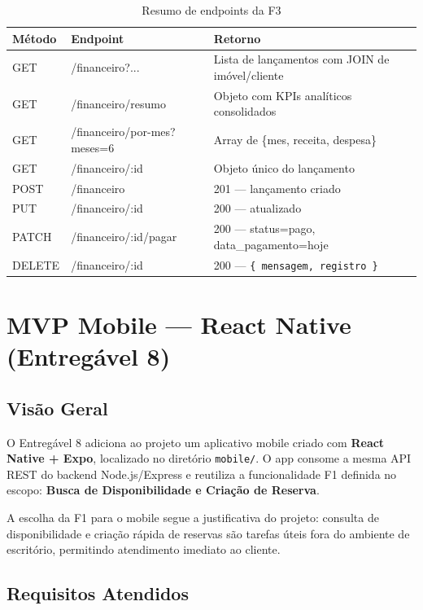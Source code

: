 \documentclass[12pt, a4paper]{article}
\newcommand{\thead}[1]{\cellcolor{tableheader}\color{white}\bfseries #1}
\newcommand{\talt}{\rowcolor{tablerowalt}}
\begin{document}
\begin{table}[H]
\centering
\begin{tabularx}{\textwidth}{|l|l|X|}
\hline
\thead{Método} & \thead{Endpoint} & \thead{Retorno} \\
\hline
GET    & /financeiro?...            & Lista de lançamentos com JOIN de imóvel/cliente \\
\talt GET    & /financeiro/resumo         & Objeto com KPIs analíticos consolidados \\
GET    & /financeiro/por-mes?meses=6 & Array de \{mes, receita, despesa\} \\
\talt GET    & /financeiro/:id            & Objeto único do lançamento \\
POST   & /financeiro                & 201 — lançamento criado \\
\talt PUT    & /financeiro/:id            & 200 — atualizado \\
PATCH  & /financeiro/:id/pagar      & 200 — status=pago, data\_pagamento=hoje \\
\talt DELETE & /financeiro/:id            & 200 — \texttt{\{ mensagem, registro \}} \\
\hline
\end{tabularx}
\caption{Resumo de endpoints da F3}
\end{table}

\section{MVP Mobile — React Native (Entregável 8)}

\subsection{Visão Geral}

O Entregável 8 adiciona ao projeto um aplicativo mobile criado com \textbf{React Native + Expo}, localizado no diretório \texttt{mobile/}. O app consome a mesma API REST do backend Node.js/Express e reutiliza a funcionalidade F1 definida no escopo: \textbf{Busca de Disponibilidade e Criação de Reserva}.

A escolha da F1 para o mobile segue a justificativa do projeto: consulta de disponibilidade e criação rápida de reservas são tarefas úteis fora do ambiente de escritório, permitindo atendimento imediato ao cliente.

\subsection{Requisitos Atendidos}
\end{document}
